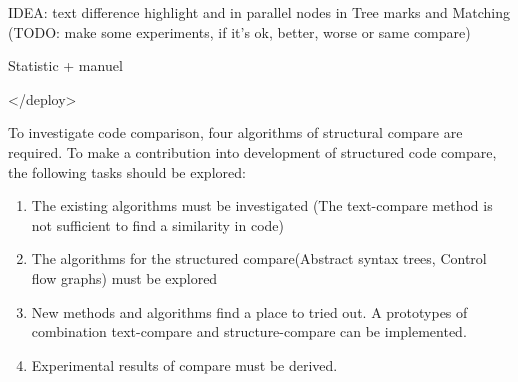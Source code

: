 IDEA: text difference highlight and in parallel nodes in Tree marks and Matching
(TODO: make some experiments, if it's ok, better, worse or same compare)

Statistic + manuel
	
</deploy>

To investigate code comparison, four algorithms of structural compare are required.
To make a contribution into development of structured code compare, the following tasks should be explored:

\begin{enumerate}
  \item The existing algorithms must be investigated (The text-compare method is not sufficient to find a similarity in code)
  \item The algorithms for the structured compare(Abstract syntax trees, Control flow graphs) must be explored 
   \item New methods and algorithms find a place to tried out. A prototypes of combination text-compare and structure-compare can be implemented.
   \item Experimental results of compare must be derived.
\end{enumerate}

